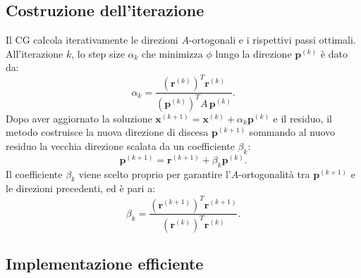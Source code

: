 \documentclass[a4paper, 12pt]{report}
\begin{document}
\subsection*{Costruzione dell'iterazione}

Il CG calcola iterativamente le direzioni $A$-ortogonali e i rispettivi passi ottimali.
All'iterazione $k$, lo step size $\alpha_k$ che minimizza $\phi$ lungo la direzione 
$\mathbf{p}^{(k)}$ è dato da:
\[
    \alpha_k = \frac{\left(\mathbf{r}^{(k)}\right)^T \mathbf{r}^{(k)}}{\left(\mathbf{p}^{(k)}\right)^T A\,\mathbf{p}^{(k)}}.
\]
Dopo aver aggiornato la soluzione $\mathbf{x}^{(k+1)} = \mathbf{x}^{(k)} + \alpha_k\mathbf{p}^{(k)}$ 
e il residuo, il metodo costruisce la nuova direzione di discesa $\mathbf{p}^{(k+1)}$ 
sommando al nuovo residuo la vecchia direzione scalata da un coefficiente $\beta_k$:
\[
    \mathbf{p}^{(k+1)} = \mathbf{r}^{(k+1)} + \beta_k\mathbf{p}^{(k)}.
\]
Il coefficiente $\beta_k$ viene scelto proprio per garantire 
l'$A$-ortogonalità tra $\mathbf{p}^{(k+1)}$ e le direzioni precedenti, ed è pari a:
\[
    \beta_k = \frac{\left(\mathbf{r}^{(k+1)}\right)^T \mathbf{r}^{(k+1)}}{\left(\mathbf{r}^{(k)}\right)^T \mathbf{r}^{(k)}}.
\]

\subsection*{Implementazione efficiente}
\end{document}
